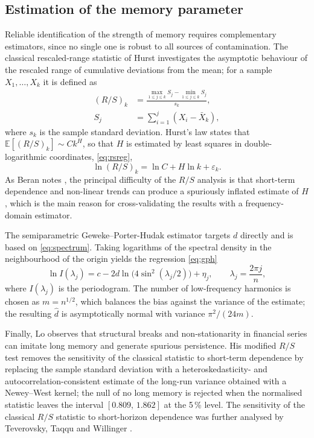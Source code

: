 \documentclass[journal]{IEEEtran}
\begin{document}
\subsection{Estimation of the memory parameter}

Reliable identification of the strength of memory requires complementary estimators, since no
single one is robust to all sources of contamination. The classical rescaled-range statistic of
Hurst \cite{hurst1951long} investigates the asymptotic behaviour of the rescaled range of
cumulative deviations from the mean; for a sample $X_1,\dots,X_k$ it is defined as
\begin{equation}\label{eq:rs}
\begin{split}
(R/S)_k&=\frac{\max_{1\le j\le k}S_j-\min_{1\le j\le k}S_j}{s_k},\\
S_j&=\sum_{i=1}^{j}(X_i-\bar X_k),
\end{split}
\end{equation}
where $s_k$ is the sample standard deviation. Hurst's law states that
$\mathbb{E}[(R/S)_k]\sim Ck^H$, so that $H$ is estimated by least squares in double-logarithmic
coordinates, \eqref{eq:rsreg},
\begin{equation}\label{eq:rsreg}
\ln (R/S)_k=\ln C+H\ln k+\varepsilon_k.
\end{equation}
As Beran notes \cite{beran1994statistics}, the principal difficulty of the $R/S$ analysis is that
short-term dependence and non-linear trends can produce a spuriously inflated estimate of $H$,
which is the main reason for cross-validating the results with a frequency-domain estimator.

The semiparametric Geweke--Porter-Hudak estimator \cite{geweke1983estimation} targets $d$
directly and is based on \eqref{eq:spectrum}. Taking logarithms of the spectral density in the
neighbourhood of the origin yields the regression \eqref{eq:gph}
\begin{equation}\label{eq:gph}
\ln I(\lambda_j)=c-2d\ln\!\Big(4\sin^2(\lambda_j/2)\Big)+\eta_j,\qquad
\lambda_j=\frac{2\pi j}{n},
\end{equation}
where $I(\lambda_j)$ is the periodogram. The number of low-frequency harmonics is chosen as
$m=n^{1/2}$, which balances the bias against the variance of the estimate; the resulting
$\hat d$ is asymptotically normal with variance $\pi^2/(24m)$.

Finally, Lo \cite{lo1991long} observes that structural breaks and non-stationarity in financial
series can imitate long memory and generate spurious persistence. His modified $R/S$ test removes
the sensitivity of the classical statistic to short-term dependence by replacing the sample
standard deviation with a heteroskedasticity- and autocorrelation-consistent estimate of the
long-run variance obtained with a Newey--West kernel; the null of no long memory is rejected
when the normalised statistic leaves the interval $[0.809,\,1.862]$ at the 5\,\% level. The
sensitivity of the classical $R/S$ statistic to short-horizon dependence was further analysed by
Teverovsky, Taqqu and Willinger \cite{teverovsky1999stock}.
\end{document}
